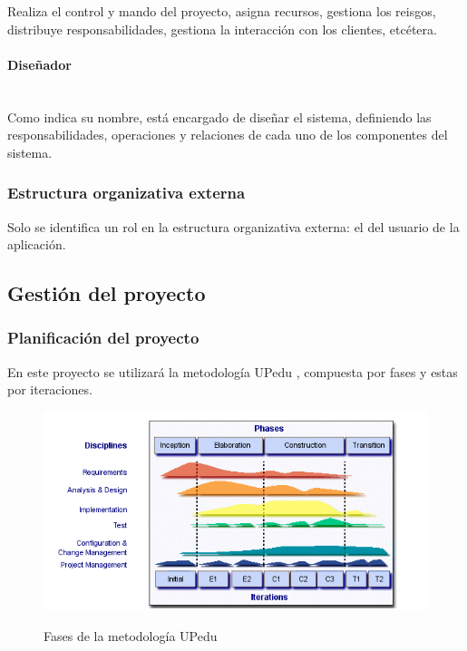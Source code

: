 \documentclass[twoside]{report}
\begin{document}
Realiza el control y mando del proyecto, asigna recursos, gestiona los reisgos, distribuye responsabilidades, gestiona la interacción con los clientes, etcétera.

\paragraph{Diseñador}\mbox{}\\

Como indica su nombre, está encargado de diseñar el sistema, definiendo las responsabilidades, operaciones y relaciones de cada uno de los componentes del sistema.

\subsubsection{Estructura organizativa externa}
Solo se identifica un rol en la estructura organizativa externa: el del usuario de la aplicación. 

\subsection{Gestión del proyecto}
\subsubsection{Planificación del proyecto}
En este proyecto se utilizará la metodología UPedu \cite{upedu}, compuesta por fases y estas por iteraciones.

\begin{figure}[h]
\label{upeduChart}
\begin{center}
\includegraphics[scale=0.75]{images/upeduFases}
\caption{Fases de la metodología UPedu} \cite{upedu}
\end{center}
\end{figure}
\end{document}
